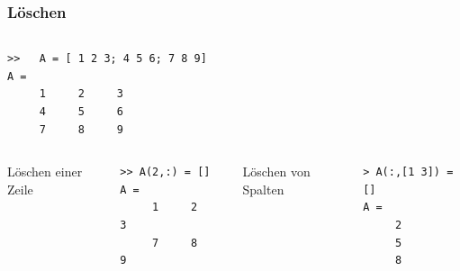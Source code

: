 %
%
\begin{frame}[fragile]\frametitle{Löschen}
\begin{columns}[c]%
%
\begin{lstlisting}[basicstyle=\tiny]
>>   A = [ 1 2 3; 4 5 6; 7 8 9]
A =
     1     2     3
     4     5     6
     7     8     9
\end{lstlisting} 
\end{columns}%
\begin{columns}[t]
%
Löschen einer Zeile
\begin{lstlisting}
>> A(2,:) = []
A =
     1     2     3
     7     8     9
\end{lstlisting}
%
Löschen von Spalten
\begin{lstlisting}
> A(:,[1 3]) = []
A =
     2
     5
     8
\end{lstlisting}
\end{columns}
\end{frame}

